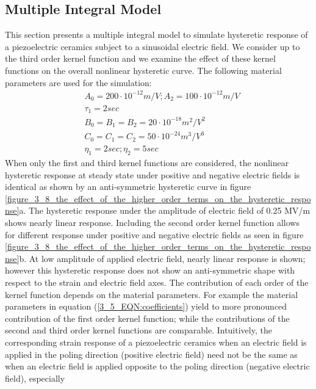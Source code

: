 \subsection{Multiple Integral Model}
This section presents a multiple integral model to simulate hysteretic response of a piezoelectric ceramics subject to a sinusoidal electric field. 
We consider up to the third order kernel function and we examine the effect of these kernel functions on the overall nonlinear hysteretic curve. 
The following material parameters are used for the simulation:
\begin{equation}
\begin{aligned}
&A_0=200 \cdot 10^{-12} m/V; A_2=100 \cdot 10^{-12} m/V \\
&\tau_1=2 sec \\
&B_0=B_1=B_2=20 \cdot 10^{-18} m^2/V^2 \\
&C_0=C_1=C_2=50 \cdot 10^{-24} m^3/V^3 \\
&\eta_1=2sec; \eta_2=5 sec  
\end{aligned}
\label{3_5_EQN:coefficients}
\end{equation}
When only the first and third kernel functions are considered, the nonlinear hysteretic response at steady state under positive and negative electric fields is identical as shown by an anti-symmetric hysteretic curve in figure \ref{figure_3_8_the_effect_of_the_higher_order_terms_on_the_hysteretic_response}a. 
The hysteretic response under the amplitude
of electric field of 0.25 MV/m shows nearly linear response. Including the second order
kernel function allows for different response under positive and negative electric fields as
seen in figure \ref{figure_3_8_the_effect_of_the_higher_order_terms_on_the_hysteretic_response}b. At low amplitude of applied electric field, nearly linear response is shown;
however this hysteretic response does not show an anti-symmetric shape with respect to the
strain and electric field axes. The contribution of each order of the kernel function depends
on the material parameters. For example the material parameters in equation (\ref{3_5_EQN:coefficients}) yield to more
pronounced contribution of the first order kernel function; while the contributions of the
second and third order kernel functions are comparable.
Intuitively, the corresponding strain response of a piezoelectric ceramics when an electric
field is applied in the poling direction (positive electric field) need not be the same as when
an electric field is applied opposite to the poling direction (negative electric field), especially
